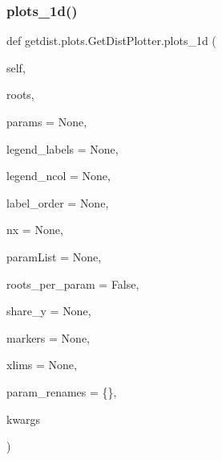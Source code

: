 \subsubsection{\texorpdfstring{plots\+\_\+1d()}{plots\_1d()}}
{\footnotesize\ttfamily def getdist.\+plots.\+Get\+Dist\+Plotter.\+plots\+\_\+1d (\begin{DoxyParamCaption}\item[{}]{self,  }\item[{}]{roots,  }\item[{}]{params = {\ttfamily None},  }\item[{}]{legend\+\_\+labels = {\ttfamily None},  }\item[{}]{legend\+\_\+ncol = {\ttfamily None},  }\item[{}]{label\+\_\+order = {\ttfamily None},  }\item[{}]{nx = {\ttfamily None},  }\item[{}]{param\+List = {\ttfamily None},  }\item[{}]{roots\+\_\+per\+\_\+param = {\ttfamily False},  }\item[{}]{share\+\_\+y = {\ttfamily None},  }\item[{}]{markers = {\ttfamily None},  }\item[{}]{xlims = {\ttfamily None},  }\item[{}]{param\+\_\+renames = {\ttfamily \{\}},  }\item[{}]{kwargs }\end{DoxyParamCaption})}

